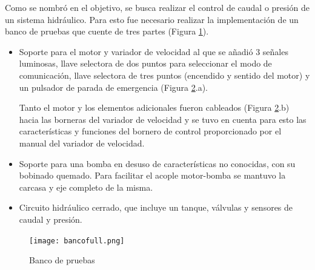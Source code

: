 Como se nombró en el objetivo, se busca realizar el control de caudal o presión de un sistema hidráulico. Para esto fue necesario realizar la implementación de un banco de pruebas que cuente de tres partes (Figura \ref{fig:bancofull}).
\begin{itemize}
	\item Soporte para el motor y variador de velocidad al que se añadió 3 señales luminosas, llave selectora de dos puntos para seleccionar el modo de comunicación, llave selectora de tres puntos (encendido y sentido del motor) y un pulsador de parada de emergencia (Figura \ref{fig:banco}.a).

	Tanto el motor y los elementos adicionales fueron cableados (Figura \ref{fig:banco}.b) hacia las borneras del variador de velocidad y se tuvo en cuenta para esto las características y funciones del bornero de control proporcionado por el manual del variador de velocidad\cite{InstaManual}. 
	
	\item Soporte para una bomba en desuso de características no conocidas, con su bobinado quemado. Para facilitar el acople motor-bomba se mantuvo la carcasa y eje completo de la misma.
	\item Circuito hidráulico cerrado, que incluye un tanque, válvulas y sensores de caudal y presión.
\end{itemize}




\begin{figure}[h!]
	\centering
	\texttt{[image: bancofull.png]}
	\label{fig:bancofull}
\end{figure}


\begin{figure}[H]
	\centering
	\caption{Banco de pruebas} \label{fig:banco}
\end{figure}

